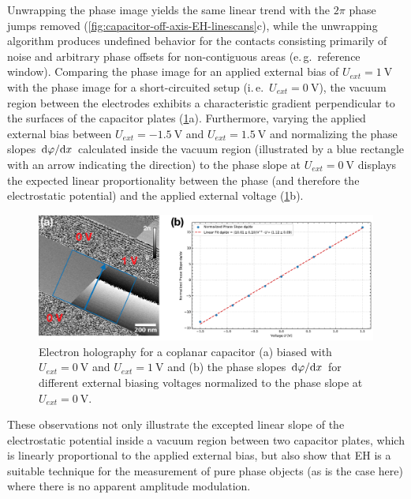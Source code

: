 Unwrapping the phase image yields the same linear trend with the $2\pi$ phase jumps removed (\cref{fig:capacitor-off-axis-EH-linescans}c), while the unwrapping algorithm produces undefined behavior for the contacts consisting primarily of noise and arbitrary phase offsets for non-contiguous areas (e.\,g.\ reference window).
\newpage
Comparing the phase image for an applied external bias of $U_{\mathit{ext}} = \SI{1}{\volt}$ with the phase image for a short-circuited setup (i.\,e.\ $U_{\mathit{ext}} = \SI{0}{\volt}$), the vacuum region between the electrodes exhibits a characteristic gradient perpendicular to the surfaces of the capacitor plates (\cref{fig:capacitor-off-axis-EH-slope}a). Furthermore, varying the applied external bias between $U_{\mathit{ext}} = \SI{-1.5}{\volt}$ and $U_{\mathit{ext}} = \SI{1.5}{\volt}$ and normalizing the phase slopes $\dv*{\varphi}{x}$ calculated inside the vacuum region (illustrated by a blue rectangle with an arrow indicating the direction) to the phase slope at $U_{\mathit{ext}} = \SI{0}{\volt}$ displays the expected linear proportionality between the phase (and therefore the electrostatic potential) and the applied external voltage (\cref{fig:capacitor-off-axis-EH-slope}b).
\begin{figure}[H]
	\centering
	\includegraphics[width=\textwidth]{Figures/Results/Capacitor/Holography/capacitor-off-axis-EH-slope.pdf}
	\caption{Electron holography for a coplanar capacitor (a) biased with $U_{\mathit{ext}} = \SI{0}{\volt}$ and $U_{\mathit{ext}} = \SI{1}{\volt}$ and (b) the phase slopes $\dv*{\varphi}{x}$ for different external biasing voltages normalized to the phase slope at $U_{\mathit{ext}} = \SI{0}{\volt}$.}
	\label{fig:capacitor-off-axis-EH-slope}
\end{figure}
These observations not only illustrate the excepted linear slope of the electrostatic potential inside a vacuum region between two capacitor plates, which is linearly proportional to the applied external bias, but also show that EH is a suitable technique for the measurement of pure phase objects (as is the case here) where there is no apparent amplitude modulation.
\newpage
